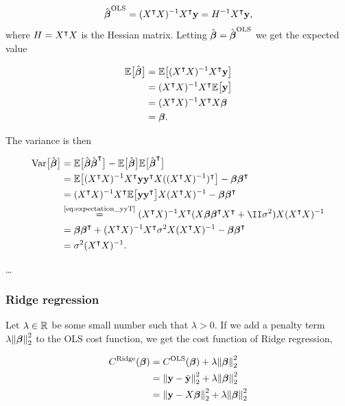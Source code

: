 \begin{align}\label{eq:optimal_beta_ols}
    \hat{\boldsymbol{\beta}}^\text{OLS} = (X^\intercal X)^{-1} X^\intercal \mathbf{y} = H^{-1} X^\intercal \mathbf{y},
\end{align}
where $H = X^\intercal X$ is the Hessian matrix.
Letting $\hat{\boldsymbol{\beta}} = \hat{\boldsymbol{\beta}}^\text{OLS}$ we get the expected value 

\begin{align*}
    \mathbb{E}\big[\hat{\boldsymbol{\beta}}\big] &= \mathbb{E}\big[(X^\intercal X)^{-1} X^\intercal \mathbf{y}\big] \\
    &= (X^\intercal X)^{-1} X^\intercal \mathbb{E}\big[\mathbf{y}\big] \\
    &= (X^\intercal X)^{-1} X^\intercal X \boldsymbol{\beta} \\
    &= \boldsymbol{\beta}.
\end{align*}

The variance is then 

\begin{align}\label{eq:variance_of_optimal_beta_ols}\nonumber 
    \variance{\optbeta} &= \EE{\optbeta \optbeta\TT} -\EE{\optbeta} \EE{\optbeta\TT} \nonumber \\
    &= \EE{\invhessian X\TT  \vec{y} \vec{y}\TT X (\invhessian)\TT} - \svec{\beta} \svec{\beta}\TT \nonumber \\
    &= \invhessian X\TT \EE{ \vec{y} \vec{y}\TT } X \invhessian - \svec{\beta} \svec{\beta}\TT \nonumber \\
    &\stackrel{\text{\eqref{eq:expectation_yyT}}}{=}\invhessian X\TT ( X\svec{\beta} \svec{\beta}\TT X\TT+ \II\sigma^2) X \invhessian \nonumber \\
    &= \svec{\beta} \svec{\beta} \TT + \invhessian X\TT \sigma^2 X \invhessian - \svec{\beta} \svec{\beta} \TT \nonumber \\
    &= \sigma^2 \invhessian.
\end{align}



\dots



\subsubsection{Ridge regression}\label{sec:Ridge}

Let $\lambda \in \mathbb{R}^{}$ be some small number such that $\lambda >0$. If we add a penalty term $\lambda \norm{\boldsymbol{\beta}}_2^2$ to the OLS cost function, we get the cost function of Ridge regression,

\begin{align*}
    C^\text{Ridge}(\boldsymbol{\beta}) &=  C^\text{OLS}(\boldsymbol{\beta}) + \lambda \norm{\boldsymbol{\beta}}_2^2 \\
    &=\norm{\mathbf{y}-\tilde{\mathbf{y}}}_2^{2}  + \lambda \norm{\boldsymbol{\beta}}_2^2 \\
    &= \norm{\mathbf{y}-X\boldsymbol{\beta}}_2^{2} + \lambda \norm{\boldsymbol{\beta}}_2^2 
\end{align*}

